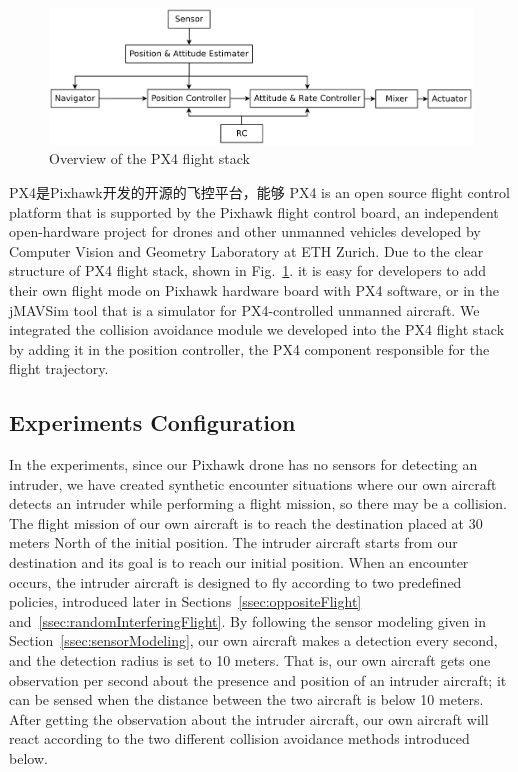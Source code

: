 \documentclass{article}
\newcommand{\jMAVSim}{\textsf{jMAVSim}}
\begin{document}
\begin{figure}[t]
	\centering
	\includegraphics[width=0.9\linewidth]{flightStack.pdf}
	\caption{Overview of the PX4 flight stack}
	\label{fig:flightStack}
\end{figure}

PX4是Pixhawk开发的开源的飞控平台，能够
PX4 is an open source flight control platform that is supported by the Pixhawk flight control board, an independent open-hardware project for drones and other unmanned vehicles developed by Computer Vision and Geometry Laboratory at ETH Zurich.
Due to the clear structure of PX4 flight stack, shown in Fig.~\ref{fig:flightStack}. it is easy for developers to add their own flight mode on Pixhawk hardware board with PX4 software, or in the \jMAVSim{} tool that is a simulator for PX4-controlled unmanned aircraft.
We integrated the collision avoidance module we developed into the PX4 flight stack by adding it in the  position controller, the PX4 component responsible for the flight trajectory.


\subsection{Experiments Configuration}
\label{ssec:experimentsConfiguration}

In the experiments, since our Pixhawk drone has no sensors for detecting an intruder, we have created synthetic encounter situations where our own aircraft detects an intruder while performing a flight mission, so there may be a collision. 
The flight mission of our own aircraft is to reach the destination placed at 30 meters North of the initial position. 
The intruder aircraft starts from our destination and its goal is to reach our initial position.
When an encounter occurs, the intruder aircraft is designed to fly according to two predefined policies, introduced later in Sections~\ref{ssec:oppositeFlight} and~\ref{ssec:randomInterferingFlight}.
By following the sensor modeling given in Section~\ref{ssec:sensorModeling}, our own aircraft makes a detection every second, and the detection radius is set to 10 meters. 
That is, our own aircraft gets one observation per second about the presence and position of an intruder aircraft; 
it can be sensed when the distance between the two aircraft is below 10 meters. 
After getting the observation about the intruder aircraft, our own aircraft will react according to the two different collision avoidance methods introduced below.
\end{document}

